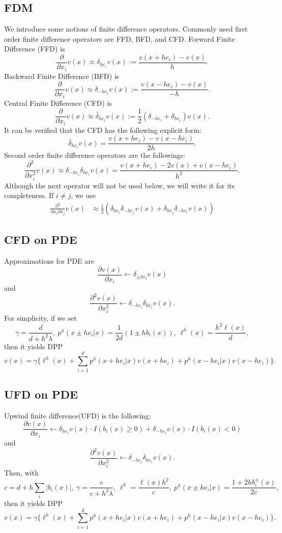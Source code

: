 \documentclass[11pt]{amsart}
\begin{document}
\subsection{FDM}
We introduce some notions of finite difference operators.
Commonly used first order finite difference operators 
are FFD, BFD, and CFD. 
Forward Finite Difference (FFD) is
$$\frac{\partial}{\partial x_{i}}v(x) \approx \delta_{he_{i}} v(x) 
:= \frac{v(x+he_{i}) - v(x)}{h}.$$
Backward Finite Difference (BFD) is
$$\frac{\partial}{\partial x_{i}}v(x) \approx \delta_{-he_{i}} v(x) 
:= \frac{v(x-he_{i}) - v(x)}{-h}.$$
Central Finite Difference (CFD) is
$$\frac{\partial}{\partial x_{i}}v(x) \approx 
\bar \delta_{h e_{i}} v(x)
:= \frac 1 2 (\delta_{-he_{i}} + \delta_{he_{i}}) v(x)
.$$
It can be verified that the CFD has the following explicit form:
$$\bar \delta_{h e_{i}} v(x) = \frac{v(x+he_{i}) - v(x-he_{i})}{2h}.$$
Second order finite difference operators are the followings:
$$
\frac{\partial^{2}}{\partial x_{i}^{2}} v(x)
\approx
\delta_{-he_{i}} \delta_{he_{i}} v(x)
= \frac{v(x+he_{i}) - 2 v(x) + v(x- he_{i})}{h^{2}}.
$$
Although the next operator will not be used below, we will write it for its completeness. If $i \neq j$, we use
$$
\begin{array}
 {ll}
\frac{\partial^{2}}{\partial x_{i} \partial x_{j}} v(x) &\approx
\frac 1 2 (\delta_{he_{i}} \delta_{-he_{j}} v(x) + 
\delta_{he_{j}} \delta_{-he_{i}} v(x))
\end{array}
$$


\subsection{CFD on PDE}
Approximations for PDE are 
$$
\frac{\partial v(x)}{\partial x_i} \leftarrow 
\delta_{\pm h e_{i}} v(x)
$$
and
$$
\frac{\partial^2 v(x)}{\partial x_i^2} \leftarrow
\delta_{-he_{i}} \delta_{he_{i}} v(x).$$
For simplicity, if we set 
$$
\gamma = \frac{d}{d+ h^{2} \lambda}, \
p^{h}(x \pm he_{i}|x) = \frac 1 {2d} (1 \pm h b_{i}(x)), \
\ell^{h}(x) = \frac{h^{2} \ell(x)}{d},
$$
then it yields DPP
$$
v (x) = \gamma 
\Big\{ \ell^{h}(x) + 
\sum_{i=1}^{d} 
p^{h}(x+he_{i}|x) v(x+he_{i})
+ p^{h}(x-he_{i}|x) v(x-he_{i})
\Big\}.
$$

\subsection{UFD on PDE}
Upwind finite difference(UFD) is the following:
$$
\frac{\partial v(x)}{\partial x_i} \leftarrow 
\delta_{ h e_{i}} v(x) \cdot I(b_{i}(x)\ge 0) +
\delta_{-he_{i}} v(x) \cdot I(b_{i}(x) <0)
$$
and
$$
\frac{\partial^2 v(x)}{\partial x_i^2} \leftarrow
\delta_{-he_{i}} \delta_{he_{i}} v(x).$$
Then, with
$$c = d+h\sum_{i} |b_{i}(x)|, \ 
\gamma = \frac{c}{c+h^{2}\lambda}, \ 
\ell^{h} = \frac{\ell(x) h^{2}}{c}, \ 
p^{h}(x \pm he_{i}|x) = \frac{1+ 2hb_{i}^{\pm}(x)}{2c},
$$
then it yields DPP
$$
v (x) = \gamma 
\Big\{ \ell^{h}(x) + 
\sum_{i=1}^{d} 
p^{h}(x+he_{i}|x) v(x+he_{i})
+ p^{h}(x-he_{i}|x) v(x-he_{i})
\Big\}.
$$
\end{document}
